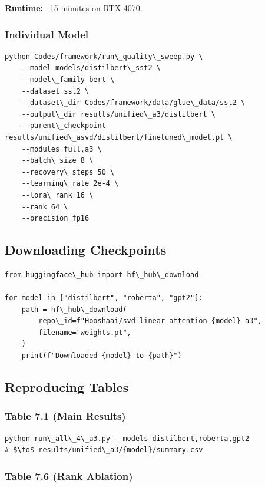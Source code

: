 \textbf{Runtime:} ~15 minutes on RTX 4070.

\subsubsection{Individual Model}

\begin{lstlisting}
python Codes/framework/run\_quality\_sweep.py \
    --model models/distilbert\_sst2 \
    --model\_family bert \
    --dataset sst2 \
    --dataset\_dir Codes/framework/data/glue\_data/sst2 \
    --output\_dir results/unified\_a3/distilbert \
    --parent\_checkpoint results/unified\_asvd/distilbert/finetuned\_model.pt \
    --modules full,a3 \
    --batch\_size 8 \
    --recovery\_steps 50 \
    --learning\_rate 2e-4 \
    --lora\_rank 16 \
    --rank 64 \
    --precision fp16
\end{lstlisting}

\subsection{Downloading Checkpoints}

\begin{lstlisting}
from huggingface\_hub import hf\_hub\_download

for model in ["distilbert", "roberta", "gpt2"]:
    path = hf\_hub\_download(
        repo\_id=f"Hooshaai/svd-linear-attention-{model}-a3",
        filename="weights.pt",
    )
    print(f"Downloaded {model} to {path}")
\end{lstlisting}

\subsection{Reproducing Tables}

\subsubsection{Table 7.1 (Main Results)}

\begin{lstlisting}
python run\_all\_4\_a3.py --models distilbert,roberta,gpt2
# $\to$ results/unified\_a3/{model}/summary.csv
\end{lstlisting}

\subsubsection{Table 7.6 (Rank Ablation)}

